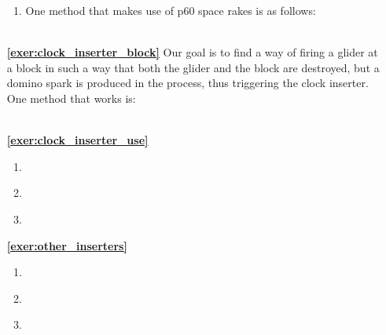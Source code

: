 \begin{multicols}{2}
\begin{itemize}[leftmargin=0em]
\begin{enumerate}[leftmargin=1.5em,label=\bf\color{ocre}(\alph*)]
			\item One method that makes use of p$60$ space rakes is as follows:\\[-0.6em]
			
			 \\
		\end{enumerate}
		
		
		\item[\bf\color{ocre}\sffamily\ref{exer:clock_inserter_block}] Our goal is to find a way of firing a glider at a block in such a way that both the glider and the block are destroyed, but a domino spark is produced in the process, thus triggering the clock inserter. One method that works is:\\[-0.6em]
		
		 \\
		
		
		\item[\bf\color{ocre}\sffamily\ref{exer:clock_inserter_use}]
		\begin{enumerate}[leftmargin=1.5em,label=\bf\color{ocre}(\alph*)]
			\item {} \\
			
			\item {} \\
			
			\item {} \\
		\end{enumerate}
		
		
		\item[\bf\color{ocre}\sffamily\ref{exer:other_inserters}]
		\begin{enumerate}[leftmargin=1.5em,label=\bf\color{ocre}(\alph*)]
			\item {} \\
			
			\item {} \\
			
			\item {} \\
		\end{enumerate}
		

\end{itemize}
\end{multicols}
